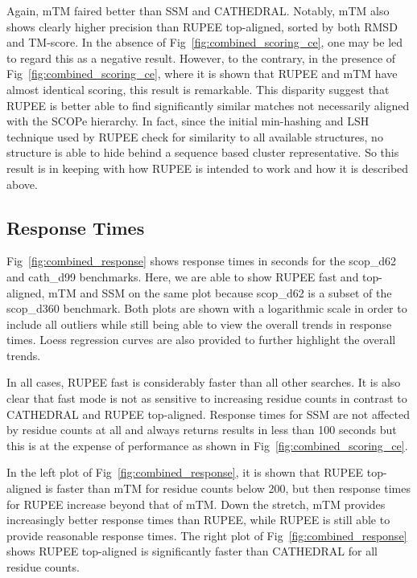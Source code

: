\documentclass[10pt,letterpaper]{article}
\renewcommand{\figurename}{Fig}
\begin{document}
Again, mTM faired better than SSM and CATHEDRAL. 
Notably, mTM also shows clearly higher precision than RUPEE top-aligned, sorted by both RMSD and TM-score. 
In the absence of \figurename~\ref{fig:combined_scoring_ce}, one may be led to regard this as a negative result. 
However, to the contrary, in the presence of \figurename~\ref{fig:combined_scoring_ce}, where it is shown that RUPEE and mTM have almost identical scoring, this result is remarkable. 
This disparity suggest that RUPEE is better able to find significantly similar matches not necessarily aligned with the SCOPe hierarchy. 
In fact, since the initial min-hashing and LSH technique used by RUPEE check for similarity to all available structures, no structure is able to hide behind a sequence based cluster representative. 
So this result is in keeping with how RUPEE is intended to work and how it is described above. 

\subsection*{Response Times}

\figurename~\ref{fig:combined_response} shows response times in seconds for the scop\_d62 and cath\_d99 benchmarks. 
Here, we are able to show RUPEE fast and top-aligned, mTM and SSM on the same plot because scop\_d62 is a subset of the scop\_d360 benchmark. 
Both plots are shown with a logarithmic scale in order to include all outliers while still being able to view the overall trends in response times. 
Loess regression curves are also provided to further highlight the overall trends. 

\begin{figure*}[h!]
\caption{Response times for RUPEE fast and RUPEE top-aligned. The response times for RUPEE top-aligned are dominated by pairwise structure alignments and do not depend on the sort order.}
\label{fig:combined_response}
\end{figure*}

In all cases, RUPEE fast is considerably faster than all other searches. 
It is also clear that fast mode is not as sensitive to increasing residue counts in contrast to CATHEDRAL and RUPEE top-aligned.
Response times for SSM are not affected by residue counts at all and always returns results in less than 100 seconds but this is at the expense of performance as shown in \figurename~\ref{fig:combined_scoring_ce}.

In the left plot of \figurename~\ref{fig:combined_response}, it is shown that RUPEE top-aligned is faster than mTM for residue counts below 200, but then response times for RUPEE increase beyond that of mTM. 
Down the stretch, mTM provides increasingly better response times than RUPEE, while RUPEE is still able to provide reasonable response times. 
The right plot of \figurename~\ref{fig:combined_response} shows RUPEE top-aligned is significantly faster than CATHEDRAL for all residue counts. 
\end{document}
